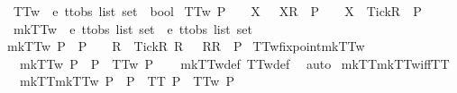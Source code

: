 %
\endisadelimproof
\isanewline
\isanewline
\isanewline
{}\isamarkupfalse%
\ TT{}w\ {\isacharcolon}{\isacharcolon}\ {\isachardoublequoteopen}{\isacharprime}e\ ttobs\ list\ set\ {\isasymRightarrow}\ bool{\isachardoublequoteclose}\ \isanewline
{\isachardoublequoteopen}TT{}w\ P\ {\isacharequal}\ {\isacharparenleft}{\isasymforall}\ {\isasymrho}\ X{\isachardot}\ {\isasymrho}\ {\isacharat}\ {\isacharbrackleft}{\isacharbrackleft}X{\isacharbrackright}\isactrlsub R{\isacharbrackright}\ {\isasymin}\ P\ {\isasymlongrightarrow}\ {\isasymrho}\ {\isacharat}\ {\isacharbrackleft}{\isacharbrackleft}X\ {\isasymunion}\ {\isacharbraceleft}Tick{\isacharbraceright}{\isacharbrackright}\isactrlsub R{\isacharbrackright}\ {\isasymin}\ P{\isacharparenright}{\isachardoublequoteclose}\isanewline
\isanewline
{}\isamarkupfalse%
\ mkTT{}w\ {\isacharcolon}{\isacharcolon}\ {\isachardoublequoteopen}{\isacharprime}e\ ttobs\ list\ set\ {\isasymRightarrow}\ {\isacharprime}e\ ttobs\ list\ set{\isachardoublequoteclose}\ \isanewline
{\isachardoublequoteopen}mkTT{}w\ P\ {\isacharequal}\ P\ {\isasymunion}\ {\isacharbraceleft}{\isasymrho}\ {\isacharat}\ {\isacharbrackleft}{\isacharbrackleft}R\ {\isasymunion}\ {\isacharbraceleft}Tick{\isacharbraceright}{\isacharbrackright}\isactrlsub R{\isacharbrackright}{\isacharbar}{\isasymrho}\ R{\isachardot}\ {\isasymrho}\ {\isacharat}\ {\isacharbrackleft}{\isacharbrackleft}R{\isacharbrackright}\isactrlsub R{\isacharbrackright}\ {\isasymin}\ P{\isacharbraceright}{\isachardoublequoteclose}\isanewline
\isanewline
{}\isamarkupfalse%
\ TT{}w{\isacharunderscore}fixpoint{\isacharunderscore}mkTT{}w{\isacharcolon}\isanewline
\ \ {\isachardoublequoteopen}{\isacharparenleft}mkTT{}w\ P\ {\isacharequal}\ P{\isacharparenright}\ {\isacharequal}\ TT{}w\ P{\isachardoublequoteclose}\isanewline
%
\isadelimproof
\ \ %
\endisadelimproof
%
\isatagproof
{}\isamarkupfalse%
\ mkTT{}w{\isacharunderscore}def\ TT{}w{\isacharunderscore}def\ \isamarkupfalse%
\ auto%
\endisatagproof
{\isafoldproof}%
%
\isadelimproof
\isanewline
%
\endisadelimproof
\isanewline
{}\isamarkupfalse%
\ mkTT{}{\isacharunderscore}mkTT{}w{\isacharunderscore}iff{\isacharunderscore}TT{}{}{\isacharcolon}\isanewline
\ \ {\isachardoublequoteopen}{\isacharparenleft}mkTT{}{\isacharparenleft}mkTT{}w\ P{\isacharparenright}\ {\isacharequal}\ P{\isacharparenright}\ {\isacharequal}\ {\isacharparenleft}TT{}\ P\ {\isasymand}\ TT{}w\ P{\isacharparenright}{\isachardoublequoteclose}\isanewline
